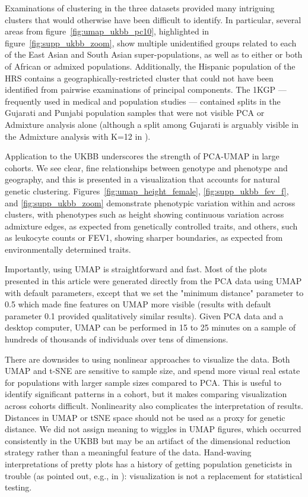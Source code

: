 \documentclass[12pt]{pnas-new}
\begin{document}
Examinations of clustering in the three datasets provided many intriguing clusters that would otherwise have been difficult to identify. In particular, several areas from figure~\ref{fig:umap_ukbb_pc10}, highlighted in figure~\ref{fig:supp_ukbb_zoom}, show multiple unidentified groups related to each of the East Asian and South Asian super-populations, as well as to either or both of African or admixed populations. Additionally, the Hispanic population of the HRS contains a geographically-restricted cluster that could not have been identified from pairwise examinations of principal components. The 1KGP --- frequently used in medical and population studies --- contained splits in the Gujarati and Punjabi population samples that were not visible PCA or Admixture analysis alone (although a split among Gujarati is arguably visible in the Admixture analysis with K=12 in \cite{10002015global}). 

Application to the UKBB underscores the strength of PCA-UMAP in large cohorts. We see clear, fine relationships between genotype and phenotype and geography, and this is presented in a visualization that accounts for natural genetic clustering. Figures~\ref{fig:umap_height_female}, \ref{fig:supp_ukbb_fev_f}, and \ref{fig:supp_ukbb_zoom} demonstrate phenotypic variation within and across clusters, with phenotypes such as height showing continuous variation across admixture edges, as expected from genetically controlled traits, and others, such as leukocyte counts or FEV1, showing sharper boundaries, as expected from environmentally determined traits.  

Importantly, using UMAP is straightforward and fast. Most of the plots presented in this article were generated directly from the PCA data using UMAP with default parameters, except that we set the "minimum distance" parameter to 0.5 which made fine features on UMAP more visible (results with default parameter 0.1 provided qualitatively similar results). Given PCA data and a desktop computer, UMAP can be performed in 15 to 25 minutes on a sample of hundreds of thousands of individuals over tens of dimensions. 

There are downsides to using nonlinear approaches to visualize the data. Both UMAP and t-SNE are sensitive to sample size, and spend more visual real estate for populations with larger sample sizes compared to PCA. This is useful to identify significant patterns in a cohort, but it makes comparing visualization across cohorts difficult. Nonlinearity also complicates the interpretation of results. Distances in UMAP or tSNE space should not be used as a proxy for genetic distance. We did not assign meaning to wiggles in UMAP figures, which occurred consistently in the UKBB but may be an artifact of the dimensional reduction strategy rather than a meaningful feature of the data. Hand-waving interpretations of pretty plots has a history of getting population geneticists in trouble (as pointed out, e.g., in \cite{novembre2008interpreting}): visualization is not a replacement for statistical testing.       
\end{document}
